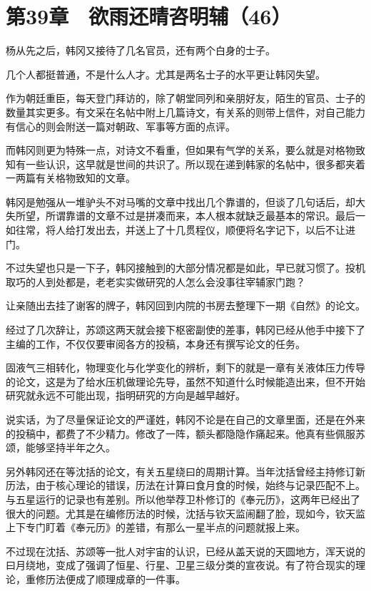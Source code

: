 \section{第39章　欲雨还晴咨明辅（46）}

杨从先之后，韩冈又接待了几名官员，还有两个白身的士子。

几个人都挺普通，不是什么人才。尤其是两名士子的水平更让韩冈失望。

作为朝廷重臣，每天登门拜访的，除了朝堂同列和亲朋好友，陌生的官员、士子的数量其实更多。有文采在名帖中附上几篇诗文，有关系的则带上信件，对自己能力有信心的则会附送一篇对朝政、军事等方面的点评。

而韩冈则更为特殊一点，对诗文不看重，但如果有气学的关系，要么就是对格物致知有一些认识，这早就是世间的共识了。所以现在递到韩家的名帖中，很多都夹着一两篇有关格物致知的文章。

韩冈是勉强从一堆驴头不对马嘴的文章中找出几个靠谱的，但谈了几句话后，却大失所望，所谓靠谱的文章不过是拼凑而来，本人根本就缺乏最基本的常识。最后一如往常，将人给打发出去，并送上了十几贯程仪，顺便将名字记下，以后不让进门。

不过失望也只是一下子，韩冈接触到的大部分情况都是如此，早已就习惯了。投机取巧的人到处都是，老老实实做研究的人怎么会没事往宰辅家门跑？

让亲随出去挂了谢客的牌子，韩冈回到内院的书房去整理下一期《自然》的论文。

经过了几次辞让，苏颂这两天就会接下枢密副使的差事，韩冈已经从他手中接下了主编的工作，不仅仅要审阅各方的投稿，本身还有撰写论文的任务。

固液气三相转化，物理变化与化学变化的辨析，剩下的就是一章有关液体压力传导的论文，这是为了给水压机做理论先导，虽然不知道什么时候能造出来，但不开始研究就永远不可能出现，指明研究的方向是越早越好。

说实话，为了尽量保证论文的严谨姓，韩冈不论是在自己的文章里面，还是在外来的投稿中，都费了不少精力。修改了一阵，额头都隐隐作痛起来。他真有些佩服苏颂，能够坚持半年之久。

另外韩冈还在等沈括的论文，有关五星绕曰的周期计算。当年沈括曾经主持修订新历法，由于核心理论的错误，历法在计算曰食月食的时候，始终与记录匹配不上。与五星运行的记录也有差别。所以他举荐卫朴修订的《奉元历》，这两年已经出了很大的问题。尤其是在编修历法的时候，沈括与钦天监闹翻了脸，现如今，钦天监上下专门盯着《奉元历》的差错，有那么一星半点的问题就报上来。

不过现在沈括、苏颂等一批人对宇宙的认识，已经从盖天说的天圆地方，浑天说的曰月绕地，变成了强调了恒星、行星、卫星三级分类的宣夜说。有了符合现实的理论，重修历法便成了顺理成章的一件事。

